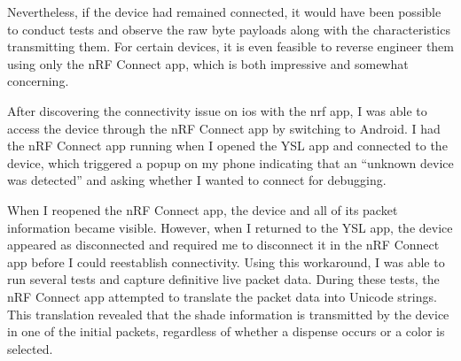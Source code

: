 Nevertheless, if the device had remained connected, it would have been possible to conduct tests and observe the raw byte payloads along with the characteristics transmitting them. For certain devices, it is even feasible to reverse engineer them using only the nRF Connect app, which is both impressive and somewhat concerning.


After discovering the connectivity issue on ios with the nrf app, I was able to access the device through the nRF Connect app by switching to Android. I had the nRF Connect app running when I opened the YSL app and connected to the device, which triggered a popup on my phone indicating that an “unknown device was detected” and asking whether I wanted to connect for debugging. 

When I reopened the nRF Connect app, the device and all of its packet information became visible. However, when I returned to the YSL app, the device appeared as disconnected and required me to disconnect it in the nRF Connect app before I could reestablish connectivity.
Using this workaround, I was able to run several tests and capture definitive live packet data. During these tests, the nRF Connect app attempted to translate the packet data into Unicode strings. This translation revealed that the shade information is transmitted by the device in one of the initial packets, regardless of whether a dispense occurs or a color is selected.
